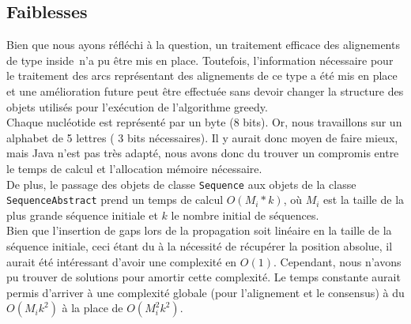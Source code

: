 \subsection{Faiblesses}

Bien que nous ayons réfléchi à la question, un traitement efficace des alignements de type \og inside\fg~n'a pu être mis en place. Toutefois, l'information nécessaire pour le traitement des arcs représentant des alignements de ce type a été mis en place et une amélioration future peut être effectuée sans devoir changer la structure des objets utilisés pour l'exécution de l'algorithme greedy.\\

Chaque nucléotide est représenté par un byte (8 bits). Or, nous travaillons sur un alphabet de 5 lettres ( 3 bits nécessaires). Il y aurait donc moyen de faire mieux, mais Java n'est pas très adapté, nous avons donc du trouver un compromis entre le temps de calcul et l'allocation mémoire nécessaire.\\

De plus, le passage des objets de classe \verb|Sequence| aux objets de la classe
\verb|SequenceAbstract| prend un temps de calcul $O(M_{i} * k)$, où $M_{i}$ est
la taille de la plus grande séquence initiale et $k$ le nombre initial de
séquences.\\

Bien que l'insertion de gaps lors de la propagation soit
linéaire en la taille de la séquence initiale, ceci étant du à la nécessité de
récupérer la position absolue, il aurait été intéressant d'avoir une complexité
en $O(1)$. Cependant, nous n'avons pu trouver de solutions pour amortir cette
complexité. Le temps constante aurait permis d'arriver à une complexité globale
(pour l'alignement et le consensus) à du $O(M_{i} k ^{2})$ à la place de
$O(M_{i}^{2} k^{2})$.\\

